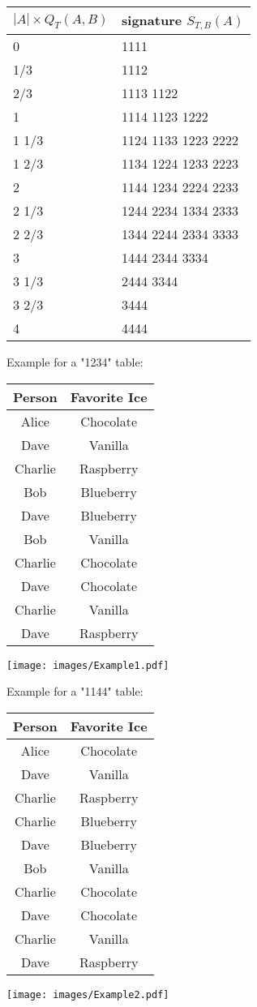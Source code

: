 \documentclass[a4paper]{article}
\begin{document}
\begin{tabular}{l|l}
 $|A| \times Q_T(A,B)$ & signature $S_{T,B}(A)$ \\\hline
 0     & 1111 \\
 1/3   & 1112 \\
 2/3   & 1113 1122 \\
 1     & 1114 1123 1222 \\
 1 1/3 & 1124 1133 1223 2222 \\
 1 2/3 & 1134 1224 1233 2223 \\
 2     & 1144 1234 2224 2233 \\
 2 1/3 & 1244 2234 1334 2333 \\
 2 2/3 & 1344 2244 2334 3333 \\
 3     & 1444 2344 3334 \\
 3 1/3 & 2444 3344 \\
 3 2/3 & 3444 \\
 4     & 4444
\end{tabular}



Example for a "1234" table:\\
\begin{tabular}[b]{c|c}
  Person  & Favorite Ice \\\hline
  Alice   & Chocolate    \\
  Dave    & Vanilla      \\
  Charlie & Raspberry    \\
  Bob     & Blueberry    \\
  Dave    & Blueberry    \\
  Bob     & Vanilla      \\
  Charlie & Chocolate    \\
  Dave    & Chocolate    \\
  Charlie & Vanilla      \\
  Dave    & Raspberry    \\
\end{tabular}
\hfill
\texttt{[image: images/Example1.pdf]}

Example for a "1144" table:\\
\begin{tabular}[b]{c|c}
  Person  & Favorite Ice \\\hline
  Alice   & Chocolate    \\
  Dave    & Vanilla      \\
  Charlie & Raspberry    \\
  Charlie & Blueberry    \\
  Dave    & Blueberry    \\
  Bob     & Vanilla      \\
  Charlie & Chocolate    \\
  Dave    & Chocolate    \\
  Charlie & Vanilla      \\
  Dave    & Raspberry    \\
\end{tabular}
\hfill
\texttt{[image: images/Example2.pdf]}
\end{document}
